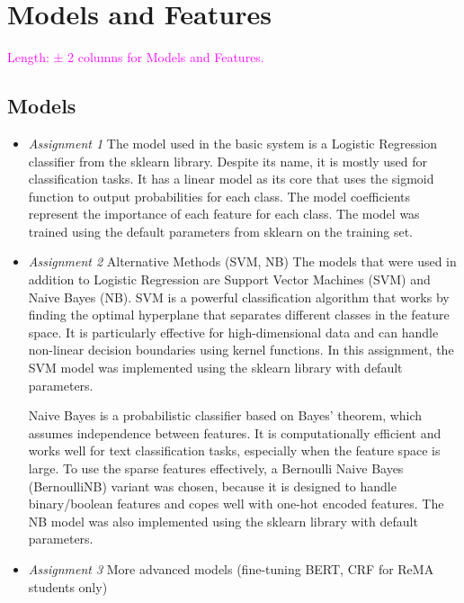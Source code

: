 \documentclass[11pt]{article}
\begin{document}
\section{Models and Features}

\textcolor{magenta}{Length: ± 2 columns for Models and Features.}

\subsection{Models}

\begin{itemize}
    \item[] \textit{Assignment 1} The model used in the basic system is a Logistic Regression classifier from the sklearn library.
          Despite its name, it is mostly used for classification tasks. It has a linear model as its core that uses the sigmoid function to output probabilities for each class.
          The model coefficients represent the importance of each feature for each class.
          The model was trained using the default parameters from sklearn on the training set.

    \item[]\textit{Assignment 2} Alternative Methods (SVM, NB) The models that were used in addition to Logistic Regression are Support Vector Machines (SVM) and Naive Bayes (NB).
          SVM is a powerful classification algorithm that works by finding the optimal hyperplane that separates different classes in the feature space.
          It is particularly effective for high-dimensional data and can handle non-linear decision boundaries using kernel functions.
          In this assignment, the SVM model was implemented using the sklearn library with default parameters.

          Naive Bayes is a probabilistic classifier based on Bayes' theorem, which assumes independence between features.
          It is computationally efficient and works well for text classification tasks, especially when the feature space is large.
          To use the sparse features effectively, a Bernoulli Naive Bayes (BernoulliNB) variant was chosen, because it is designed to handle binary/boolean features and copes well with one-hot encoded features.
          The NB model was also implemented using the sklearn library with default parameters.

    \item[]\textit{Assignment 3} More advanced models (fine-tuning BERT, CRF for ReMA students only)
\end{itemize}
\end{document}
